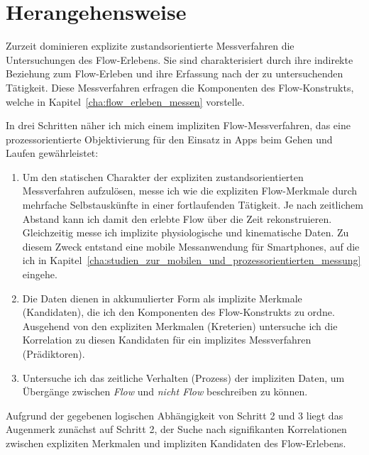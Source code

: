 

\section{Herangehensweise} 

\label{sec:herangehensweise}

Zurzeit dominieren explizite zustandsorientierte Messverfahren die Untersuchungen des Flow-Erlebens. Sie sind charakterisiert durch ihre indirekte Beziehung zum Flow-Erleben und ihre Erfassung nach der zu untersuchenden Tätigkeit. Diese Messverfahren erfragen die Komponenten des Flow-Konstrukts, welche in Kapitel~\ref{cha:flow_erleben_messen} vorstelle. 

In drei Schritten näher ich mich einem impliziten Flow-Messverfahren, das eine prozessorientierte Objektivierung für den Einsatz in Apps beim Gehen und Laufen gewährleistet: 
\begin{enumerate}
	\item Um den statischen Charakter der expliziten zustandsorientierten Messverfahren aufzulösen, messe ich wie \citet{Reinhardt2006, Schuler2009} die expliziten Flow-Merkmale durch mehrfache Selbstauskünfte in einer fortlaufenden Tätigkeit. Je nach zeitlichem Abstand kann ich damit den erlebte Flow über die Zeit rekonstruieren. Gleichzeitig messe ich implizite physiologische und kinematische Daten. Zu diesem Zweck entstand eine mobile Messanwendung für Smartphones, auf die ich in Kapitel~\ref{cha:studien_zur_mobilen_und_prozessorientierten_messung} eingehe.
	
	\item Die Daten dienen in akkumulierter Form als implizite Merkmale (Kandidaten), die ich den Komponenten des Flow-Konstrukts zu ordne. Ausgehend von den expliziten Merkmalen (Kreterien) untersuche ich die Korrelation zu diesen Kandidaten für ein implizites Messverfahren (Prädiktoren).
	
	\item Untersuche ich das zeitliche Verhalten (Prozess) der impliziten Daten, um Übergänge zwischen \emph{Flow} und \emph{nicht Flow} beschreiben zu können. 
\end{enumerate}

Aufgrund der gegebenen logischen Abhängigkeit von Schritt 2 und 3 liegt das Augenmerk zunächst auf Schritt 2, der Suche nach signifikanten Korrelationen zwischen expliziten Merkmalen und impliziten Kandidaten des Flow-Erlebens. 

